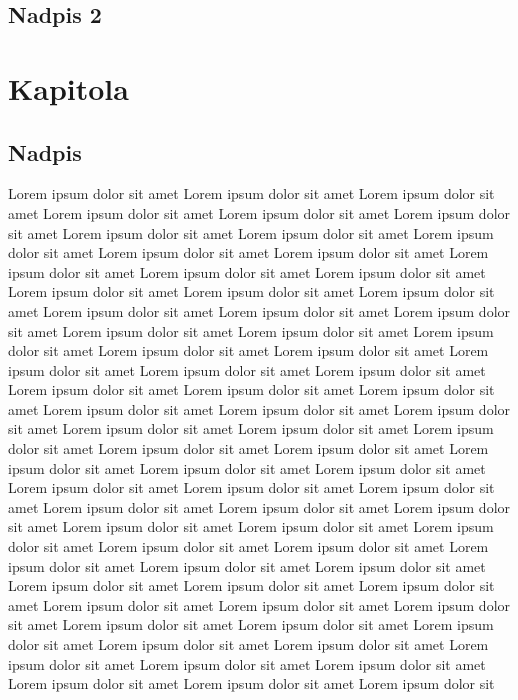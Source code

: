 \section{Nadpis 2}\label{nadpis-2}
\chapter{Kapitola}

\section{Nadpis}\label{nadpis}

Lorem ipsum dolor sit amet Lorem ipsum dolor sit amet Lorem ipsum dolor
sit amet Lorem ipsum dolor sit amet Lorem ipsum dolor sit amet Lorem
ipsum dolor sit amet Lorem ipsum dolor sit amet Lorem ipsum dolor sit
amet Lorem ipsum dolor sit amet Lorem ipsum dolor sit amet Lorem ipsum
dolor sit amet Lorem ipsum dolor sit amet Lorem ipsum dolor sit amet
Lorem ipsum dolor sit amet Lorem ipsum dolor sit amet Lorem ipsum dolor
sit amet Lorem ipsum dolor sit amet Lorem ipsum dolor sit amet Lorem
ipsum dolor sit amet Lorem ipsum dolor sit amet Lorem ipsum dolor sit
amet Lorem ipsum dolor sit amet Lorem ipsum dolor sit amet Lorem ipsum
dolor sit amet Lorem ipsum dolor sit amet Lorem ipsum dolor sit amet
Lorem ipsum dolor sit amet Lorem ipsum dolor sit amet Lorem ipsum dolor
sit amet Lorem ipsum dolor sit amet Lorem ipsum dolor sit amet Lorem
ipsum dolor sit amet Lorem ipsum dolor sit amet Lorem ipsum dolor sit
amet Lorem ipsum dolor sit amet Lorem ipsum dolor sit amet Lorem ipsum
dolor sit amet Lorem ipsum dolor sit amet Lorem ipsum dolor sit amet
Lorem ipsum dolor sit amet Lorem ipsum dolor sit amet Lorem ipsum dolor
sit amet Lorem ipsum dolor sit amet Lorem ipsum dolor sit amet Lorem
ipsum dolor sit amet Lorem ipsum dolor sit amet Lorem ipsum dolor sit
amet Lorem ipsum dolor sit amet Lorem ipsum dolor sit amet Lorem ipsum
dolor sit amet Lorem ipsum dolor sit amet Lorem ipsum dolor sit amet
Lorem ipsum dolor sit amet Lorem ipsum dolor sit amet Lorem ipsum dolor
sit amet Lorem ipsum dolor sit amet Lorem ipsum dolor sit amet Lorem
ipsum dolor sit amet Lorem ipsum dolor sit amet Lorem ipsum dolor sit
amet Lorem ipsum dolor sit amet Lorem ipsum dolor sit amet Lorem ipsum
dolor sit amet Lorem ipsum dolor sit amet Lorem ipsum dolor sit amet
Lorem ipsum dolor sit amet Lorem ipsum dolor sit amet Lorem ipsum dolor
sit amet Lorem ipsum dolor sit amet Lorem ipsum dolor sit amet Lorem
ipsum dolor sit amet Lorem ipsum dolor sit amet Lorem ipsum dolor sit
